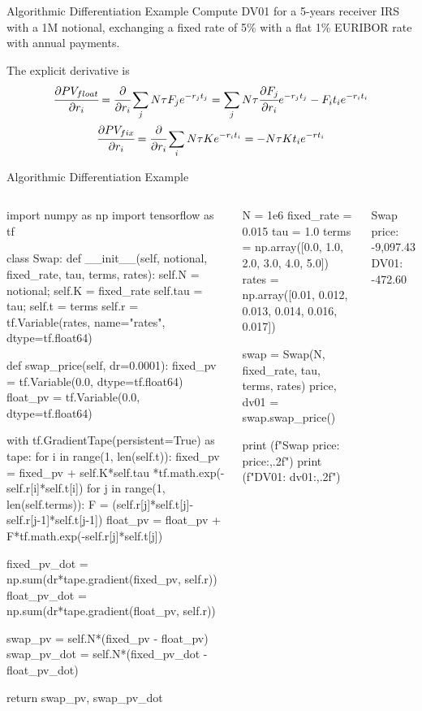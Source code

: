 \documentclass{beamer}
\begin{document}
\begin{frame}[fragile]{Algorithmic Differentiation Example}
Compute DV01 for a 5-years receiver IRS with a 1M notional, exchanging a fixed rate of 5\% with a flat 1\% EURIBOR rate with annual payments.

The explicit derivative is
\begin{equation*}
\begin{gathered}
\cfrac{\partial PV_{float}}{\partial r_i} = \cfrac{\partial}{\partial r_i}\sum_j N\tau F_j e^{-r_j t_j} = \sum_j N\tau \cfrac{\partial F_j}{\partial r_i} e^{-r_j t_j} - F_i t_i e^{-r_i t_i} \\
\cfrac{\partial PV_{fix}}{\partial r_i} = \cfrac{\partial}{\partial r_i}\sum_i N\tau K e^{-r_i t_i} = - N\tau K t_i e^{-rt_i}        
\end{gathered}
\end{equation*}
\end{frame}

\begin{frame}[fragile]{Algorithmic Differentiation Example}
\begin{columns}
\begin{ipython}
import numpy as np
import tensorflow as tf

class Swap:
  def __init__(self, notional, fixed_rate, tau, terms, rates):
    self.N = notional; self.K = fixed_rate
    self.tau = tau; self.t = terms
    self.r = tf.Variable(rates, name="rates", dtype=tf.float64)

  def swap_price(self, dr=0.0001):
    fixed_pv = tf.Variable(0.0, dtype=tf.float64)
    float_pv = tf.Variable(0.0, dtype=tf.float64)

    with tf.GradientTape(persistent=True) as tape:
      for i in range(1, len(self.t)):
        fixed_pv = fixed_pv + self.K*self.tau
                   *tf.math.exp(-self.r[i]*self.t[i])
      for j in range(1, len(self.terms)):
        F = (self.r[j]*self.t[j]-self.r[j-1]*self.t[j-1])
        float_pv = float_pv + F*tf.math.exp(-self.r[j]*self.t[j])
    
    fixed_pv_dot = np.sum(dr*tape.gradient(fixed_pv, self.r))
    float_pv_dot = np.sum(dr*tape.gradient(float_pv, self.r))

    swap_pv = self.N*(fixed_pv - float_pv)
    swap_pv_dot = self.N*(fixed_pv_dot - float_pv_dot)

    return swap_pv, swap_pv_dot
\end{ipython}
\begin{ipython}
N = 1e6
fixed_rate  = 0.015
tau         = 1.0
terms       = np.array([0.0, 1.0, 2.0, 3.0, 4.0, 5.0])
rates       = np.array([0.01, 0.012, 0.013, 0.014, 0.016, 0.017])

swap = Swap(N, fixed_rate, tau, terms, rates)
price, dv01 = swap.swap_price()

print (f"Swap price: {price:,.2f}")
print (f"DV01: {dv01:,.2f}")
\end{ipython}
\begin{ioutput}

Swap price: -9,097.43
DV01: -472.60
\end{ioutput}
\end{columns}
\end{frame}
\end{document}
